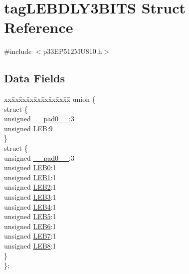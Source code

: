 \hypertarget{structtag_l_e_b_d_l_y3_b_i_t_s}{}\section{tag\+L\+E\+B\+D\+L\+Y3\+B\+I\+TS Struct Reference}
\label{structtag_l_e_b_d_l_y3_b_i_t_s}


{\ttfamily \#include $<$p33\+E\+P512\+M\+U810.\+h$>$}

\subsection*{Data Fields}
\begin{DoxyCompactItemize}
\item 
\begin{tabbing}
xx\=xx\=xx\=xx\=xx\=xx\=xx\=xx\=xx\=\kill
union \{\\
\>struct \{\\
\>\>unsigned \hyperlink{structtag_l_e_b_d_l_y3_b_i_t_s_adf71f3d8410c1f1dbbc96680a92c49af}{\_\_pad0\_\_}:3\\
\>\>unsigned \hyperlink{structtag_l_e_b_d_l_y3_b_i_t_s_a850b96052b17c96a4012653317c39bdf}{LEB}:9\\
\>\} \\
\>struct \{\\
\>\>unsigned \hyperlink{structtag_l_e_b_d_l_y3_b_i_t_s_adf71f3d8410c1f1dbbc96680a92c49af}{\_\_pad0\_\_}:3\\
\>\>unsigned \hyperlink{structtag_l_e_b_d_l_y3_b_i_t_s_a1710dcadd784ef12033a5cf8121accb3}{LEB0}:1\\
\>\>unsigned \hyperlink{structtag_l_e_b_d_l_y3_b_i_t_s_ab0505c0f812822c77a65e8bfe2db4f40}{LEB1}:1\\
\>\>unsigned \hyperlink{structtag_l_e_b_d_l_y3_b_i_t_s_a120826056ccccfac30aa9e8a0569ae88}{LEB2}:1\\
\>\>unsigned \hyperlink{structtag_l_e_b_d_l_y3_b_i_t_s_a7b918c1b7306fd3ff86ab19bcb5365a4}{LEB3}:1\\
\>\>unsigned \hyperlink{structtag_l_e_b_d_l_y3_b_i_t_s_a5fbd877152dfc4182c4456b4224ec747}{LEB4}:1\\
\>\>unsigned \hyperlink{structtag_l_e_b_d_l_y3_b_i_t_s_a4371c46a68a319773f493c25667df943}{LEB5}:1\\
\>\>unsigned \hyperlink{structtag_l_e_b_d_l_y3_b_i_t_s_a2b8fccc4fb31a13c611cfb0d1c53aff0}{LEB6}:1\\
\>\>unsigned \hyperlink{structtag_l_e_b_d_l_y3_b_i_t_s_aa76d586b04119d8459718019ddd964ef}{LEB7}:1\\
\>\>unsigned \hyperlink{structtag_l_e_b_d_l_y3_b_i_t_s_a9b22b47001301c6ae00c3eea0f385091}{LEB8}:1\\
\>\} \\
\}; \\

\end{tabbing}\end{DoxyCompactItemize}


